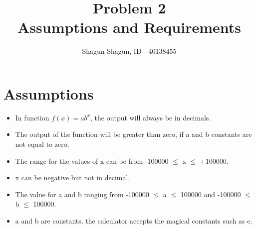 \documentclass[a4paper,12pt]{article}
\title{Problem 2\\
\large Assumptions and Requirements}
\author{Shagun Shagun, ID - 40138455}
\date{}
\begin{document}
\maketitle %
\section{Assumptions}
    \begin{itemize}
        \item In function $f(x) = ab^x$, the output will always be in decimals.
        \item The output of the function will be greater than zero, if a and b constants are not equal to zero.
        \item The range for the values of x can be from -100000 $\leq$ x $\leq$ +100000.
        \item x can be negative but not in decimal.
        \item The value for a and b ranging from  -100000 $\leq$ a $\leq$ 100000 and -100000 $\leq$ b $\leq$ 100000.
        \item a and b are constants, the calculator accepts the magical constants such as e.
    \end{itemize}
\end{document}
